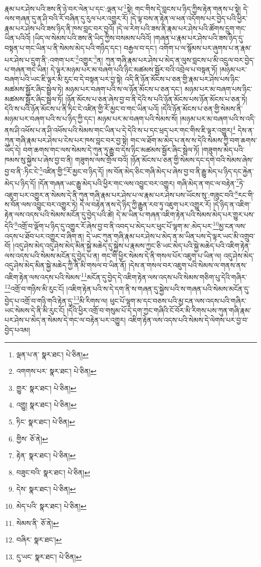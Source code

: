 རྣམ་པར་ཤེས་པའི་ཟས་ནི་ཉེ་བར་ལེན་པ་དང་:ལྡན་པ་\footnote{ལྡན་པ་ན་  སྣར་ཐང་།  པེ་ཅིན། }སྟེ། གང་གིས་དེ་བླངས་པ་ཉིད་ཀྱིས་རྟེན་གནས་པ་སྟེ། དེ་ལས་གཞན་དུ་ན་ཤི་བའི་རོ་བཞིན་དུ་རུལ་པར་འགྱུར་རོ། །དེ་ལྟ་བས་ན་རྟེན་ལ་ཕན་འདོགས་པར་བྱེད་པའི་ཕྱིར་རྣམ་པར་ཤེས་པའི་ཟས་ཉིད་ནི་ཁས་བླང་བར་བྱའོ། །དེ་ལ་རེག་པའི་ཟས་ནི་རྣམ་པར་ཤེས་པའི་ཚོགས་དྲུག་གང་ཡིན་པའིའོ། །ཡིད་ལ་སེམས་པའི་ཟས་ནི་ཡིད་ཀྱིས་བསམས་པའིའོ། །གཞན་པ་རྣམ་པར་ཤེས་པའི་ཟས་ཉིད་དུ་བསྟན་པ་གང་ཡིན་པ་ནི་སེམས་མེད་པའི་གཉིད་དང་། བརྒྱལ་བ་དང་། འགོག་པ་ལ་སྙོམས་པར་ཞུགས་པ་ན་རྣམ་པར་ཤེས་པ་དྲུག་ནི་:འགག་པར་\footnote{འགགས་པར་  སྣར་ཐང་།  པེ་ཅིན། }འགྱུར་\footnote{གྱུར་  སྣར་ཐང་།  པེ་ཅིན། }ན། ཀུན་གཞི་རྣམ་པར་ཤེས་པ་མེད་ན་ལུས་བླངས་པ་མི་འདྲུལ་བར་བྱེད་པ་གཞན་གང་ཡིན། དེ་ལྟར་མཉམ་པར་མ་བཞག་པའི་ཉིང་མཚམས་སྦྱོར་བའི་འབྲེལ་པ་བསྟན་ཏོ། །མཉམ་པར་བཞག་པའི་ཡང་ཇི་ལྟར་མི་རུང་བ་དེ་བསྟན་པར་བྱ་སྟེ། འདི་ནི་ཉོན་མོངས་པ་ཅན་གྱི་རྣམ་པར་ཤེས་པས་ཉིང་མཚམས་སྦྱོར་ཞིང་སྦྲེལ་ཏེ། མཉམ་པར་བཞག་པའི་ས་ལ་ཉོན་མོངས་པ་ཅན་དང་། མཉམ་པར་མ་བཞག་པས་ཉིང་མཚམས་སྦྱོར་ཞིང་སྦྲེལ་ཏོ། །ཉོན་མོངས་པ་ཅན་ཞེས་བྱ་བ་ནི་དེའི་ས་པའི་ཉོན་མོངས་པས་ཉོན་མོངས་པ་ཅན་ཏེ། དེའི་ས་པའི་ཉོན་མོངས་པ་ནི་ཏིང་ངེ་འཛིན་གྱི་རོ་མྱང་བ་གང་ཡིན་པའོ། །དེའི་ཉོན་མོངས་པ་ཅན་གྱི་སེམས་ནི་མཉམ་པར་བཞག་པའི་ས་པ་ཉིད་ཀྱི་དང་། མཉམ་པར་མ་བཞག་པའི་སེམས་སོ། །མཉམ་པར་མ་བཞག་པའི་ས་འདི་ནས་ཤི་འཕོས་པ་ན་ཤི་འཕོས་པའི་སེམས་གང་ཡིན་པ་དེ་དེའི་ས་པ་དང་ཕྲད་པར་གང་གིས་ཇི་ལྟར་འགྱུར།\footnote{འགྱུ།  སྣར་ཐང་།  པེ་ཅིན། } དེས་ན་ཀུན་གཞི་རྣམ་པར་ཤེས་པ་ངེས་པར་ཁས་བླང་བར་བྱ་སྟེ། གང་ལ་ཐོག་མ་མེད་པ་ནས་ས་དེའི་སེམས་ཀྱི་བག་ཆགས་ཡོད་དེ། བག་ཆགས་གང་ལས་སེམས་དེ་ཀུན་ཏུ་རྒྱུ་བ་དེས་ཉིང་མཚམས་སྦྱོར་ཞིང་སྦྲེལ་ཏོ། །གཟུགས་མེད་པའི་ཁམས་སུ་སྐྱེས་པ་ཞེས་བྱ་བ་ནི། གཟུགས་ལས་གྲོལ་བའོ། །ཉོན་མོངས་པ་ཅན་གྱི་སེམས་དང་དགེ་བའི་སེམས་ཞེས་བྱ་བ་ནི་:ཏིང་ངེ་\footnote{ཏིང་  སྣར་ཐང་།  པེ་ཅིན། }འཛིན་གྱི་\footnote{གྱིས་  ཅོ་ནེ། }རོ་མྱང་བ་ཉིད་དོ། །ས་བོན་མེད་ཅིང་གཞི་མེད་པ་ཞེས་བྱ་བ་ནི་རྒྱུ་མེད་པ་ཉིད་དང་རྐྱེན་མེད་པ་ཉིད་དོ། །དོན་གཞན་ཡང་རྒྱུ་མེད་པའི་ཕྱིར་གང་ལས་འབྱུང་བར་འགྱུར། གཞི་མེད་ན་གང་ལ་བརྟེན་\footnote{རྟེན་  སྣར་ཐང་།  པེ་ཅིན། }ཏེ་འཇུག་པར་འགྱུར་ན་སེམས་དེ་ནི་ཀུན་གཞི་རྣམ་པར་ཤེས་པ་ལ་རྣམ་པར་ཤེས་པས་ཡོངས་སུ་:གཟུང་བའི་\footnote{བཟུང་བའི་  སྣར་ཐང་།  པེ་ཅིན། }རང་གི་ས་བོན་ལས་འབྱུང་བར་འགྱུར་ཏེ། དེ་ལ་བརྟེན་ནས་དེ་ཉིད་ཀྱི་རྒྱུན་རབ་ཏུ་འཇུག་པར་འགྱུར་རོ། །དེ་ཉིད་ན་འཇིག་རྟེན་ལས་འདས་པའི་སེམས་མངོན་དུ་བྱེད་པའི་ཚེ། དེ་མ་ཡིན་པ་གཞན་འཇིག་རྟེན་པའི་སེམས་མེད་པར་གྱུར་པས་དེའི་\footnote{དེས་  སྣར་ཐང་།  པེ་ཅིན། }འགྲོ་བ་ལྡོག་པ་ཉིད་དུ་འགྱུར་རོ་ཞེས་བྱ་བ་ནི་འབད་པ་མེད་པར་ཕུང་པོ་ལྷག་མ་:མེད་པར་\footnote{མེད་པའི་  སྣར་ཐང་།  པེ་ཅིན། }མྱ་ངན་ལས་འདས་པ་ཐོབ་པར་འགྱུར་བ་ཞིག་ན། དེ་ཡང་ཀུན་གཞི་རྣམ་པར་ཤེས་པ་མེད་ན་མ་ཡིན་པས་དེ་ལྟར་ཡང་མི་འགྲུབ་བོ། །འདུ་ཤེས་མེད་འདུ་ཤེས་མེད་མིན་སྐྱེ་མཆེད་དུ་སྐྱེས་པ་རྣམས་ཀྱང་ཅི་ཡང་མེད་པའི་སྐྱེ་མཆེད་པའི་འཇིག་རྟེན་ལས་འདས་པའི་སེམས་མངོན་དུ་བྱེད་པ་ན། གང་གི་ཕྱིར་སེམས་དེ་ནི་གསལ་པོར་འཇུག་པ་ཡིན་ལ། འདུ་ཤེས་མེད་འདུ་ཤེས་མེད་མིན་སྐྱེ་མཆེད་ཀྱི་ནི་མི་གསལ་བ་ཡིན་ནོ། །དེས་ན་གསལ་བར་འཇུག་པའི་སེམས་ལ་གནས་ནས་འཇིག་རྟེན་ལས་འདས་པའི་སེམས་\footnote{སེམས་ནི་  ཅོ་ནེ། }མངོན་དུ་བྱེད་དེ་འཇིག་རྟེན་ལས་འདས་པའི་སེམས་གཅིག་པུ་དེའི་གཞིར་\footnote{བཞིར་  སྣར་ཐང་། }འགྲོ་བ་གཉིས་མི་རུང་ངོ། །འཇིག་རྟེན་པའི་ས་དེ་དག་ནི་ས་གཞན་དུ་སྐྱེས་པའི་ས་གཞན་པའི་སེམས་མངོན་དུ་བྱེད་པ་འགྲོ་བ་གཉི་གའི་རྟེན་དུ་\footnote{དུ་ཡང་  སྣར་ཐང་།  པེ་ཅིན། }མི་རིགས་ལ། ཕུང་པོ་ལྷག་མ་དང་བཅས་པའི་མྱ་ངན་ལས་འདས་པའི་གཞིར་ཡང་སེམས་དེ་ནི་མི་རུང་ངོ། །དེའི་ཕྱིར་འགྲོ་བ་གསུམ་པོ་དེ་དག་ཀྱང་གཞིའི་ངོ་བོར་མི་རིགས་པས་ཀུན་གཞི་རྣམ་པར་ཤེས་པ་མེད་ན་སེམས་དེ་གང་ལ་བརྟེན་པར་འགྱུར། འཇིག་རྟེན་ལས་འདས་པའི་སེམས་དེ་ལེགས་པར་བྱ་བ་བྱེད་པའམ། 